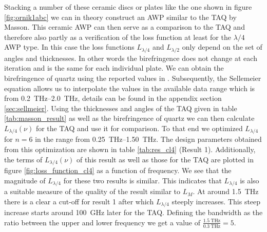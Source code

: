 Stacking a number of these ceramic discs or plates like the one shown in figure \ref{fig:ornik1abc} we can in theory construct an AWP similar to the TAQ by Masson. This ceramic AWP can then serve as a comparison to the TAQ and therefore also partly as a verification of the loss function at least for the $\lambda/4$ AWP type. In this case the loss functions $L_{\lambda/4}$ and $L_{\lambda/2}$ only depend on the set of angles and thicknesses. In other words the birefringence does not change at each iteration and is the same for each individual plate. We can obtain the birefringence of quartz using the reported values in \cite{DGrischkowsky1990}. Subsequently, the Sellemeier equation allows us to interpolate the values in the available data range which is from \SIrange{0.2}{2.0}{\tera \hertz}, details can be found in the appendix section \ref{sec:sellmeier}. Using the thicknesses and angles of the TAQ given in table \ref{tab:masson_result} as well as the birefringence of quartz we can then calculate $L_{\lambda/4}(\nu)$ for the TAQ and use it for comparison. To that end we optimized $L_{\lambda/4}$ for $n=6$ in the range from \SIrange{0.25}{1.50}{\tera \hertz}. The design parameters obtained from this optimization are shown in table \ref{tab:res_cl4} (Result 1). Additionally, the terms of $L_{\lambda/4}(\nu)$ of this result as well as those for the TAQ are plotted in figure \ref{fig:loss_function_cl4} as a function of frequency. We see that the magnitude of $L_{\lambda/4}$ for these two results is similar. This indicates that $L_{\lambda/4}$ is also a suitable measure of the quality of the result similar to $L_{M}$. At around \SI{1.5}{\tera \hertz} there is a clear a cut-off for result 1 after which $L_{\lambda/4}$ steeply increases. This steep increase starts around \SI{100}{\giga \hertz} later for the TAQ. Defining the bandwidth as the ratio between the upper and lower frequency we get a value of  $\frac{\SI{1.5}{\tera \hertz}}{\SI{0.3}{\tera \hertz}}=5$. 

\begin{table}[ht]
    \centering
    
    \caption{Design parameters for result 1 and 2. Both results are obtained through the optimization of $L_{\lambda/4}$ for $n=6$. In the case of result 1 the frequency range for the optimization was limited to \SIrange[range-phrase=-, range-units=single]{0.25}{1.50}{\tera \hertz} while for result 2 the range was set to \SIrange[range-phrase=-, range-units=single]{0.50}{2.25}{\tera \hertz}.}
    \label{tab:res_cl4}
\end{table}

